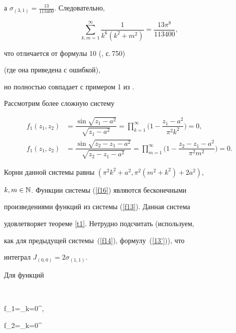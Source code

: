 а $\sigma_{(3,1)}=\frac{13}{113400}$. Следовательно,


$$


\sum_{k,m=1}^\infty\frac 1{k^6(k^2+m^2)}=\frac{13\pi^8}{113400},


$$


что отличается от формулы 10 (\cite{6}, с.\,750)


(где она приведена с ошибкой),


но полностью совпадает с примером 1 из \cite{7}.





Рассмотрим более сложную систему


\begin{equation}\label{f16}


\begin{split}


f_1(z_1,z_2)&=\dfrac{\sin\sqrt{z_1-a^2}}{\sqrt{z_1-a^2}}=


\prod\limits_{k=1}^\infty


\bigg(1-\dfrac{z_1-a^2}{\pi^2k^2}\bigg)=0,\\


f_1(z_1,z_2)&=\dfrac{\sin\sqrt{z_2-z_1-a^2}}{\sqrt{z_2-z_1-a^2}}=


\prod\limits_{m=1}^\infty


\bigg(1-\dfrac{z_2-z_1-a^2}{\pi^2m^2}\bigg)=0.\end{split}


\end{equation}


Корни данной системы равны $(\pi^2k^2+a^2,\pi^2(m^2+k^2)+2a^2)$,


$k,m\in\Bbb N$. Функции системы (\ref{f16}) являются бесконечными 


произведениями функций из системы (\ref{f13}).  Данная система 


удовлетворяет теореме \ref{t1}. Нетрудно подсчитать (используем, 


как для предыдущей системы~(\ref{f14}), формулу~(\ref{13'})), что


интеграл $J_{(0,0)}=2\sigma_{(1,1)}.$





Для функций


$$


f_1=\sum_{k=0}^\infty{},\quad


f_2=\sum_{k=0}^\infty{}


